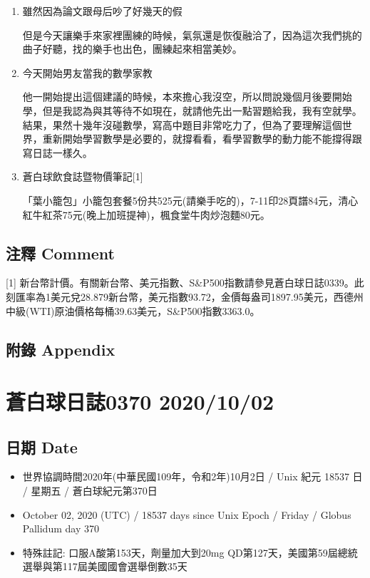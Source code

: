 \documentclass[a5paper, 11pt
]{book}
\providecommand{\tightlist}{%
  \setlength{\itemsep}{0pt}\setlength{\parskip}{0pt}}
\begin{document}
\begin{enumerate}
\def\labelenumi{\arabic{enumi}.}
\item
  雖然因為論文跟母后吵了好幾天的假

  但是今天讓樂手來家裡團練的時候，氣氛還是恢復融洽了，因為這次我們挑的曲子好聽，找的樂手也出色，團練起來相當美妙。
\item
  今天開始男友當我的數學家教

  他一開始提出這個建議的時候，本來擔心我沒空，所以問說幾個月後要開始學，但是我認為與其等待不如現在，就請他先出一點習題給我，我有空就學。結果，果然十幾年沒碰數學，寫高中題目非常吃力了，但為了要理解這個世界，重新開始學習數學是必要的，就撐看看，看學習數學的動力能不能撐得跟寫日誌一樣久。
\item
  蒼白球飲食誌暨物價筆記{[}1{]}

  「葉小籠包」小籠包套餐5份共525元(請樂手吃的)，7-11印28頁譜84元，清心紅牛紅茶75元(晚上加班提神)，楓食堂牛肉炒泡麵80元。
\end{enumerate}

\hypertarget{ux6ce8ux91cb-comment-28}{%
\subsection{注釋 Comment}\label{ux6ce8ux91cb-comment-28}}

{[}1{]}
新台幣計價。有關新台幣、美元指數、S\&P500指數請參見蒼白球日誌0339。此刻匯率為1美元兌28.879新台幣，美元指數93.72，金價每盎司1897.95美元，西德州中級(WTI)原油價格每桶39.63美元，S\&P500指數3363.0。

\hypertarget{ux9644ux9304-appendix-28}{%
\subsection{附錄 Appendix}\label{ux9644ux9304-appendix-28}}

\hypertarget{ux84bcux767dux7403ux65e5ux8a8c0370-20201002}{%
\section{蒼白球日誌0370
2020/10/02}\label{ux84bcux767dux7403ux65e5ux8a8c0370-20201002}}

\hypertarget{ux65e5ux671f-date-29}{%
\subsection{日期 Date}\label{ux65e5ux671f-date-29}}

\begin{itemize}
\tightlist
\item
  世界協調時間2020年(中華民國109年，令和2年)10月2日 / Unix 紀元 18537 日
  / 星期五 / 蒼白球紀元第370日
\item
  October 02, 2020 (UTC) / 18537 days since Unix Epoch / Friday / Globus
  Pallidum day 370
\item
  特殊註記: 口服A酸第153天，劑量加大到20mg
  QD第127天，美國第59屆總統選舉與第117屆美國國會選舉倒數35天
\end{itemize}
\end{document}
